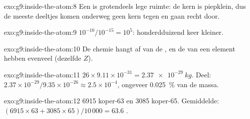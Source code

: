 \begin{solution}{exo:g9:inside-the-atom:8}
Een  is grotendeels lege ruimte: de kern is piepklein, dus de meeste
deeltjes komen onderweg geen kern tegen en gaan recht door.
\end{solution}

\begin{solution}{exo:g9:inside-the-atom:9}
$10^{-10} / 10^{-15} = 10^{5}$: honderdduizend keer kleiner.
\end{solution}

\begin{solution}{exo:g9:inside-the-atom:10}
De chemie hangt af van de , en de  van een element
hebben evenveel  (dezelfde $Z$).
\end{solution}

\begin{solution}{exo:g9:inside-the-atom:11}
$26 \times 9.11 \times 10^{-31} = \qty{2.37e-29}{kg}$. Deel:
$2.37 \times 10^{-29} / 9.35 \times 10^{-26} \approx 2.5 \times
10^{-4}$, ongeveer \qty{0.025}{\percent} van de massa.
\end{solution}

\begin{solution}{exo:g9:inside-the-atom:12}
6915  koper-63 en 3085  koper-65. Gemiddelde:
$(6915 \times 63 + 3085 \times 65)/10\,000 = 63.6$ .
\end{solution}

